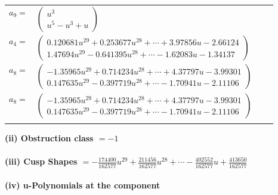\documentclass[1p]{elsarticle_modified}
\theoremstyle{definition}
\begin{document}
\begin{tabular}{m{7pt} m{180pt} m{7pt} m{180pt} }
\flushright $a_{9}=$&$\begin{pmatrix}u^3\\u^5- u^3+u\end{pmatrix}$ \\
\flushright $a_{4}=$&$\begin{pmatrix}0.120681 u^{29}+0.253677 u^{28}+\cdots+3.97856 u-2.66124\\1.47694 u^{29}-0.641395 u^{28}+\cdots-1.62083 u-1.34137\end{pmatrix}$ \\
\flushright $a_{8}=$&$\begin{pmatrix}-1.35965 u^{29}+0.714234 u^{28}+\cdots+4.37797 u-3.99301\\0.147635 u^{29}-0.397719 u^{28}+\cdots-1.70941 u-2.11106\end{pmatrix}$\\ \flushright $a_{8}=$&$\begin{pmatrix}-1.35965 u^{29}+0.714234 u^{28}+\cdots+4.37797 u-3.99301\\0.147635 u^{29}-0.397719 u^{28}+\cdots-1.70941 u-2.11106\end{pmatrix}$\\&\end{tabular}
\flushleft \textbf{(ii) Obstruction class $= -1$}\\~\\
\flushleft \textbf{(iii) Cusp Shapes $= -\frac{174400}{162577} u^{29}+\frac{211456}{162577} u^{28}+\cdots-\frac{402552}{162577} u+\frac{413650}{162577}$}\\~\\
\newpage\renewcommand{\arraystretch}{1}
\flushleft \textbf{(iv) u-Polynomials at the component}\newline \\
\end{document}

